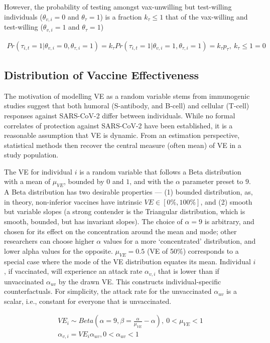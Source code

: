 \documentclass[12pt]{article}
\begin{document}
However, the probability of testing amongst vax-unwilling but test-willing individuals ($\theta_{v, i} = 0$ and $\theta_{\tau} = 1$) is a fraction $k_{\tau} \leq 1$ that of the vax-willing and test-willing ($\theta_{v, i} = 1$ and $\theta_{\tau} = 1$)

\begin{eqnarray}
	Pr({\tau}_{i,t}=1 |  \theta_{v,i} = 0, \theta_{\tau,i} = 1) = k_{\tau} Pr({\tau}_{i,t}=1 |  \theta_{v,i} = 1, \theta_{\tau,i} = 1) = k_{\tau} p_{\tau}, \ k_{\tau} \leq 1
	= 0
\end{eqnarray}

\subsection{Distribution of Vaccine Effectiveness}
The motivation of modelling VE as a random variable stems from immunogenic studies suggest that both humoral (S-antibody, and B-cell) and cellular (T-cell) responses against SARS-CoV-2 differ between individuals. While no formal correlates of protection against SARS-CoV-2 have been established, it is a reasonable assumption that VE is dynamic. From an estimation perspective, statistical methods then recover the central measure (often mean) of VE in a study population. 

The VE for individual $i$ is a random variable that follows a Beta distribution with a mean of $\mu_{VE}$, bounded by $0$ and $1$, and with the $\alpha$ parameter preset to $9$. A Beta distribution has two desirable properties --- (1) bounded distribution, as, in theory, non-inferior vaccines have intrinsic $VE \in [0\%, 100\%]$, and (2) smooth but variable slopes (a strong contender is the Triangular distribution, which is smooth, bounded, but has invariant slopes). The choice of $\alpha = 9$ is arbitrary, and chosen for its effect on the concentration around the mean and mode; other researchers can choose higher $\alpha$ values for a more `concentrated' distribution, and lower alpha values for the opposite. $\mu_{VE} = 0.5$ (VE of 50\%) corresponds to a special case where the mode of the VE distribution equates its mean. Individual $i$, if vaccinated, will experience an attack rate $\alpha_{v, i}$ that is lower than if unvaccinated $\alpha_{uv}$ by the drawn VE. This constructs individual-specific counterfactuals. For simplicity, the attack rate for the unvaccinated  $\alpha_{uv}$ is a scalar, i.e., constant for everyone that is unvaccinated.

\begin{eqnarray}
	{VE}_{i} \sim Beta(\alpha = 9, \beta = \frac{\alpha}{\mu_{VE}} - \alpha), \ 0 < \mu_{VE} < 1 \\
	\alpha_{v, i} = {VE}_{i} \alpha_{uv}, 0 < \alpha_{uv} < 1
\end{eqnarray}
\end{document}
